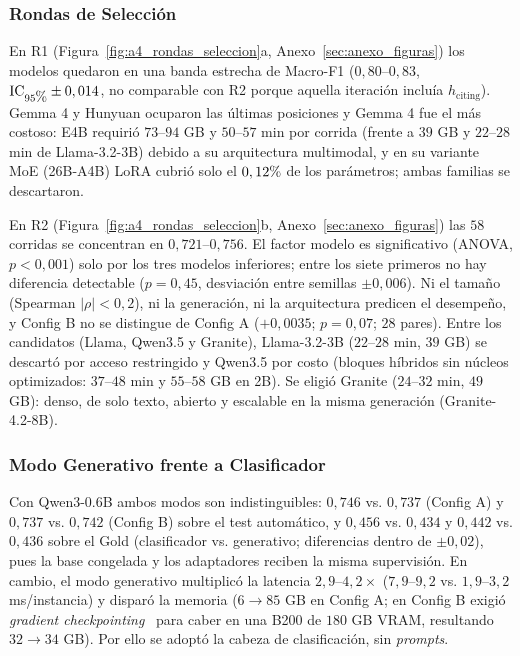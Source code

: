 \documentclass[conference]{IEEEtran}
\newcommand{\pct}{\mbox{\symbol{37}}}
\begin{document}
\subsubsection{Rondas de Selección}

En R1 (Figura~\ref{fig:a4_rondas_seleccion}a, Anexo~\ref{sec:anexo_figuras}) los modelos quedaron en una banda estrecha de Macro-F1 ($0,80\text{--}0,83$, $\text{IC}_{95\pct{}} \pm 0,014$, no comparable con R2 porque aquella iteración incluía $h_{\text{citing}}$). Gemma 4 y Hunyuan ocuparon las últimas posiciones y Gemma 4 fue el más costoso: E4B requirió $73\text{--}94$ GB y $50\text{--}57$ min por corrida (frente a $39$ GB y $22\text{--}28$ min de Llama-3.2-3B) debido a su arquitectura multimodal, y en su variante MoE (26B-A4B) LoRA cubrió solo el $0,12\pct{}$ de los parámetros; ambas familias se descartaron.

En R2 (Figura~\ref{fig:a4_rondas_seleccion}b, Anexo~\ref{sec:anexo_figuras}) las $58$ corridas se concentran en $0,721\text{--}0,756$. El factor modelo es significativo (ANOVA, $p<0,001$) solo por los tres modelos inferiores; entre los siete primeros no hay diferencia detectable ($p=0,45$, desviación entre semillas $\pm 0,006$). Ni el tamaño (Spearman $|\rho|<0,2$), ni la generación, ni la arquitectura predicen el desempeño, y Config B no se distingue de Config A ($+0,0035$; $p=0,07$; $28$ pares). Entre los candidatos (Llama, Qwen3.5 y Granite), Llama-3.2-3B ($22\text{--}28$ min, $39$ GB) se descartó por acceso restringido y Qwen3.5 por costo (bloques híbridos sin núcleos optimizados: $37\text{--}48$ min y $55\text{--}58$ GB en 2B). Se eligió Granite ($24\text{--}32$ min, $49$ GB): denso, de solo texto, abierto y escalable en la misma generación (Granite-4.2-8B).

\subsubsection{Modo Generativo frente a Clasificador}

Con Qwen3-0.6B ambos modos son indistinguibles: $0,746$ vs. $0,737$ (Config A) y $0,737$ vs. $0,742$ (Config B) sobre el test automático, y $0,456$ vs. $0,434$ y $0,442$ vs. $0,436$ sobre el Gold (clasificador vs. generativo; diferencias dentro de $\pm 0,02$), pues la base congelada y los adaptadores reciben la misma supervisión. En cambio, el modo generativo multiplicó la latencia $2,9\text{--}4,2\times$ ($7,9\text{--}9,2$ vs. $1,9\text{--}3,2$ ms/instancia) y disparó la memoria ($6 \to 85$ GB en Config A; en Config B exigió \textit{gradient checkpointing}~\cite{Chen2016} para caber en una B200 de $180$ GB VRAM, resultando $32 \to 34$ GB). Por ello se adoptó la cabeza de clasificación, sin \textit{prompts}.
\end{document}
